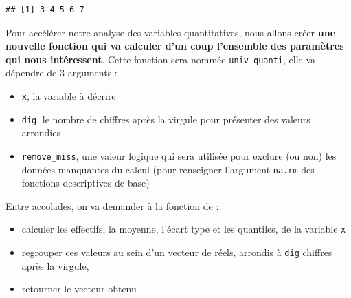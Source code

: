 \documentclass[
]{book}
\providecommand{\tightlist}{%
  \setlength{\itemsep}{0pt}\setlength{\parskip}{0pt}}
\begin{document}
\begin{verbatim}
## [1] 3 4 5 6 7
\end{verbatim}

Pour accélérer notre analyse des variables quantitatives, nous allons créer \textbf{une nouvelle fonction qui va calculer d'un coup l'ensemble des paramètres qui nous intéressent}. Cette fonction sera nommée \texttt{univ\_quanti}, elle va dépendre de 3 arguments :

\begin{itemize}
\tightlist
\item
  \texttt{x}, la variable à décrire
\item
  \texttt{dig}, le nombre de chiffres après la virgule pour présenter des valeurs arrondies
\item
  \texttt{remove\_miss}, une valeur logique qui sera utilisée pour exclure (ou non) les données manquantes du calcul (pour renseigner l'argument \texttt{na.rm} des fonctions descriptives de base)
\end{itemize}

Entre accolades, on va demander à la fonction de :

\begin{itemize}
\tightlist
\item
  calculer les effectifs, la moyenne, l'écart type et les quantiles, de la variable \texttt{x}
\item
  regrouper ces valeurs au sein d'un vecteur de réels, arrondis à \texttt{dig} chiffres après la virgule,
\item
  retourner le vecteur obtenu
\end{itemize}
\end{document}
